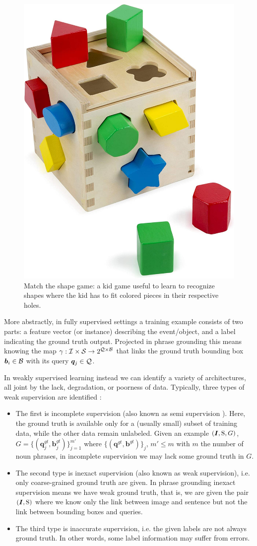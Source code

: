 \begin{figure}[H]
  \centering
  \includegraphics[width=.4\textwidth]{figures/match-shapes-game.jpg}
  \caption[Match the shape game]{ Match the shape game: a kid game
    useful to learn to recognize shapes where the kid has to fit
    colored pieces in their respective holes. }
  \label{fig:match-the-shape-game}
\end{figure}

More abstractly, in fully supervised settings a training example
consists of two parts: a feature vector (or instance) describing the
event/object, and a label indicating the ground truth output.
Projected in phrase grounding this means knowing the map $\gamma :
\mathcal{I} \times \mathcal{S} \rightarrow 2^{\mathcal{Q} \times \mathcal{B}}$ that links the
ground truth bounding box $\bm{b}_i \in \mathcal{B}$ with its query
$\bm{q}_j \in \mathcal{Q}$.

In weakly supervised learning instead we can identify a variety of
architectures, all joint by the lack, degradation, or poorness of
data. Typically, three types of weak supervision are identified
\cite{zhou2018brief}:

\begin{itemize}
  \item The first is incomplete supervision (also known as semi
  supervision \cite{rohrbach2016grounding}). Here, the ground truth is
  available only for a (usually small) subset of training data, while
  the other data remain unlabeled. Given an example $(\bm{I}, \mathrm{S},
  G)$, $G = \{ (\bm{q}^{gt}_j, \bm{b}^{gt}_j) \}^{m'}_{j=1}$ where $\{
  (\bm{q}^{gt}, \bm{b}^{gt}) \}_j$, $m' \leq m$ with $m$ the number of
  noun phrases, in incomplete supervision we may lack some ground
  truth in $G$.
  \item The second type is inexact supervision (also known as weak
  supervision), i.e. only coarse-grained ground truth are given. In
  phrase grounding inexact supervision means we have weak ground
  truth, that is, we are given the pair $(\bm{I}, \mathrm{S})$ where we
  know only the link between image and sentence but not the link
  between bounding boxes and queries.
  \item The third type is inaccurate supervision, i.e. the given
  labels are not always ground truth. In other words, some label
  information may suffer from errors.
\end{itemize}

